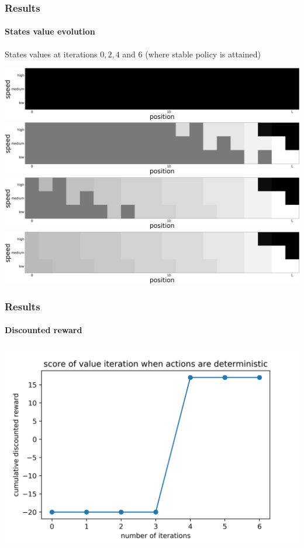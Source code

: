 \documentclass[dvipsnames,svgnames]{beamer}
\begin{document}
\begin{frame}
\frametitle{Results}
\framesubtitle{States value evolution}
\begin{block}{}
\centering
States values at iterations $0,2,4$ and $6$ (where stable policy is attained)
\end{block}
\vspace{1cm}
\centering
\includegraphics[scale=0.1]{img/value0.jpg}\\
\includegraphics[scale=0.1]{img/value2.jpg}\\
\includegraphics[scale=0.1]{img/value4.jpg}\\
\includegraphics[scale=0.1]{img/value6.jpg}\\




\end{frame}
\begin{frame}
\frametitle{Results}
\framesubtitle{Discounted reward}
\centering
\includegraphics[scale=0.1]{img/scores.jpg}
\end{frame}
\end{document}
